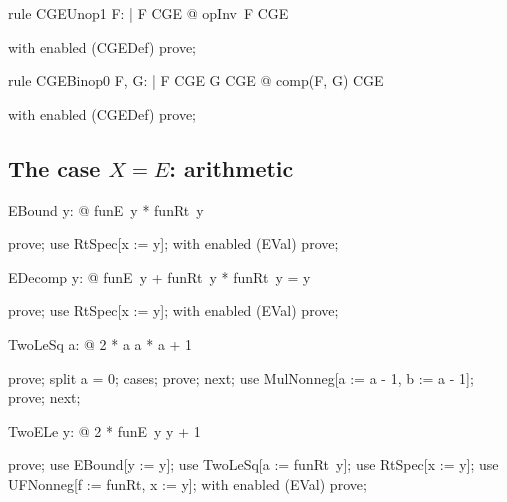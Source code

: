 \documentclass{article}
\begin{document}
\begin{theorem}{rule CGEUnop1}
  \forall F: \nat \fun \nat | F \in CGE @ opInv~F \in CGE
\end{theorem}

\begin{zproof}
with enabled (CGEDef) prove;
\end{zproof}

\begin{theorem}{rule CGEBinop0}
  \forall F, G: \nat \fun \nat | F \in CGE \land G \in CGE @ comp(F, G) \in CGE
\end{theorem}

\begin{zproof}
with enabled (CGEDef) prove;
\end{zproof}


\subsection{The case $X = E$: arithmetic}

\begin{theorem}{EBound}
  \forall y: \nat @ funE~y  * funRt~y
\end{theorem}

\begin{zproof}
prove;
use RtSpec[x := y];
with enabled (EVal) prove;
\end{zproof}

\begin{theorem}{EDecomp}
  \forall y: \nat @ funE~y + funRt~y * funRt~y = y
\end{theorem}

\begin{zproof}
prove;
use RtSpec[x := y];
with enabled (EVal) prove;
\end{zproof}

\begin{theorem}{TwoLeSq}
  \forall a: \nat @ 2 * a \leq a * a + 1
\end{theorem}

\begin{zproof}
prove;
split a = 0;
cases;
prove;
next;
use MulNonneg[a := a - 1, b := a - 1];
prove;
next;
\end{zproof}

\begin{theorem}{TwoELe}
  \forall y: \nat @ 2 * funE~y \leq y + 1
\end{theorem}

\begin{zproof}
prove;
use EBound[y := y];
use TwoLeSq[a := funRt~y];
use RtSpec[x := y];
use UFNonneg[f := funRt, x := y];
with enabled (EVal) prove;
\end{zproof}
\end{document}

